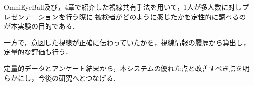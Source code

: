 


OmniEyeBall及び，4章で紹介した視線共有手法を用いて，1人が多人数に対しプレゼンテーションを行う際に
被検者がどのように感じたかを定性的に調べるのが本実験の目的である．

一方で，意図した視線が正確に伝わっていたかを，視線情報の履歴から算出し，定量的な評価も行う．

定量的データとアンケート結果から，本システムの優れた点と改善すべき点を明らかにし，今後の研究へとつなげる．